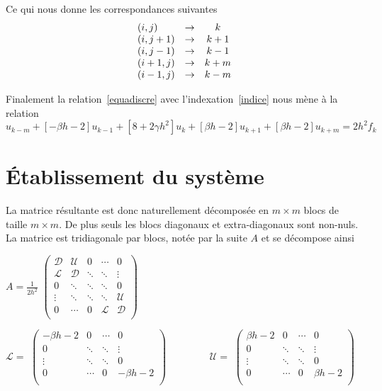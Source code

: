 \documentclass[twoside,12pt]{report}
\theoremstyle{remark}
\begin{document}
Ce qui nous donne les correspondances suivantes
\begin{equation*}
\begin{array}{l c c}
(i,j) &\rightarrow &k\\
(i,j+1) &\rightarrow &k+1\\
(i,j-1) &\rightarrow &k-1\\
(i+1,j) &\rightarrow &k+m\\
(i-1,j) &\rightarrow &k-m
\end{array}
\end{equation*}

Finalement la relation~\eqref{equadiscre} avec l'indexation~\eqref{indice} nous mène à la relation
\begin{equation}
[-\beta h -2]u_{k-m}+[-\beta h -2]u_{k-1}+[8+2\gamma h^2]u_{k}+[\beta h-2]u_{k+1}+[\beta h-2]u_{k+m}=2h^2 f_{k}
\end{equation}

\section{Établissement du système}
La matrice résultante est donc naturellement décomposée en $m\times m$ blocs de taille $m\times m$. De plus seuls les blocs diagonaux et extra-diagonaux sont non-nuls. La matrice est tridiagonale par blocs, notée par la suite $A$ et se décompose ainsi

\begin{center}
$A=\frac{1}{2h^2}$
$\begin{pmatrix}
\mathcal{D} & \mathcal{U} & 0 & \cdots & 0 \\
\mathcal{L} & \mathcal{D} & \ddots & \ddots & \vdots \\
0 & \ddots & \ddots & \ddots & 0 \\
\vdots & \ddots & \ddots & \ddots & \mathcal{U}\\
0 & \cdots & 0 & \mathcal{L} & \mathcal{D}\\
\end{pmatrix}$
\\[1.5cm]
\end{center}

\begin{center}
$\mathcal{L}=$
$\begin{pmatrix}
-\beta h -2 &  0 &  \cdots &  0 \\
0 &  \ddots &  \ddots &  \vdots \\
\vdots &  \ddots &  \ddots &  0\\
0 &  \cdots &  0 &  -\beta h -2\\
\end{pmatrix}$
$\qquad\qquad\mathcal{U}=$
$\begin{pmatrix}
\beta h -2 &  0 &  \cdots &  0 \\
0 &  \ddots &  \ddots &  \vdots \\
\vdots &  \ddots &  \ddots &  0\\
0 &  \cdots &  0 &  \beta h -2\\
\end{pmatrix}$
\\[1.5cm]
\end{center}
\end{document}
